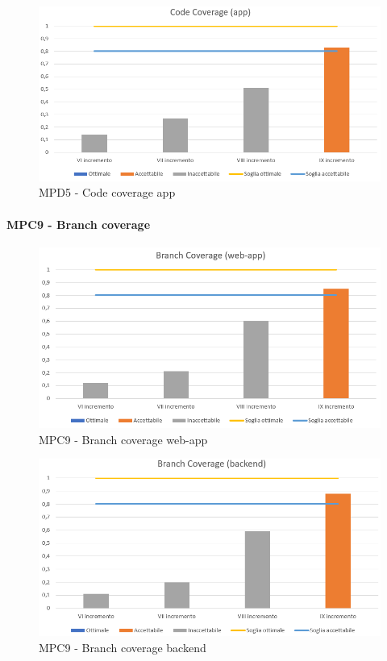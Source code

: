   \begin{figure}[h!]
    \centering
      \includegraphics[scale=0.8]{Immagini/CodeCov APPA.PNG}
    \caption{MPD5 - Code coverage app}
  \end{figure}


  \clearpage
  \paragraph{MPC9 - Branch coverage}
  \begin{figure}[h!]
    \centering
      \includegraphics[scale=0.8]{Immagini/BranchCov WAA.PNG}
    \caption{MPC9 - Branch coverage web-app}
  \end{figure}

  \begin{figure}[h!]
    \centering
      \includegraphics[scale=0.8]{Immagini/BranchCov BEA.PNG}
    \caption{MPC9 - Branch coverage backend}
  \end{figure}

